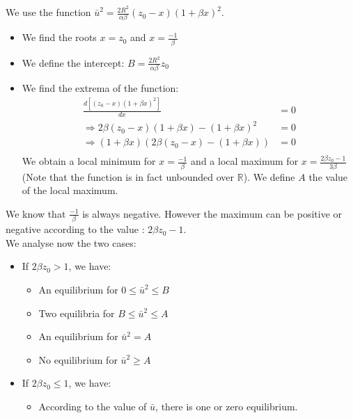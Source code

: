 We use the function $\bar{u}^2 = \frac{2R^2}{\alpha \beta} (z_0-x)(1+\beta x)^2 $.
\begin{itemize}
\item We find the roots $x = z_0$ and $x = \frac{-1}{\beta} $
\item We define the intercept: $B = \frac{2R^2}{\alpha \beta} z_0 $
\item We find the extrema of the function: \begin{align*}
\frac{d\left[ (z_0 - x) (1+ \beta x)^2 \right]}{dx} &= 0 \\
\Rightarrow  2 \beta (z_0 - x) (1+ \beta x) - (1+ \beta x)^2 &= 0 \\
\Rightarrow   (1+ \beta x)     \left( 2 \beta (z_0 - x)- (1+ \beta x) \right) &= 0 \\
\end{align*}
We obtain a local minimum for $x = \frac{-1}{\beta}$ and a local maximum for $x = \frac{2\beta z_0 -1}{3 \beta} $ (Note that the function is in fact unbounded over $\mathbb{R}$).
We define $A$ the value of the local maximum.
\end{itemize}

We know that $\frac{-1}{\beta}$ is always negative. However the maximum can be positive or negative according to the value : $2\beta z_0 -1 $. \\
 We analyse now the two cases: 
\begin{itemize}
\item If $2\beta z_0 > 1$, we have: 
 \begin{itemize}
\item An equilibrium for $0 \le \bar{u}^2 \le B $ 
\item Two equilibria for $B \le \bar{u}^2 \le A  $
\item An equilibrium for $\bar{u}^2 = A  $
\item No equilibrium for $ \bar{u}^2 \ge A  $
\end{itemize}
\item If $2\beta z_0 \le 1$, we have: 
\begin{itemize}
\item According to the value of $\bar{u}$, there is one or zero equilibrium. 
\end{itemize}
\end{itemize}

